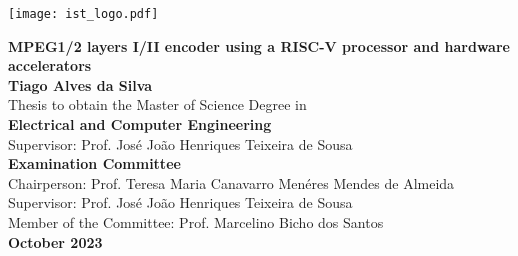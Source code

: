 \documentclass[10pt]{esda}
\title{}
\author{}
\date{}
\begin{document}
\texttt{[image: ist\_logo.pdf]}

\thispagestyle{empty}

\begin{onehalfspace}

\begin{center}
\begin{Large}
  \vspace{5cm}
  {\bf \Large {MPEG1/2 layers I/II encoder using a RISC-V processor and hardware accelerators}}\\
  \vspace{1.5cm}
  {\bf \large Tiago Alves da Silva}\\
  \vspace{2cm}
  \normalsize {Thesis to obtain the Master of Science Degree in}\\
  \vspace{0.5cm}
  {\bf \Large {Electrical and Computer Engineering}}\\
  \vspace{2cm}
  \normalsize {Supervisor: Prof. José João Henriques Teixeira de Sousa}\\
  \vspace{1.5cm}
  {\bf \large Examination Committee}\\
  \vspace{1cm}
  \normalsize {Chairperson: Prof. Teresa Maria Canavarro Menéres Mendes de Almeida}\\
  \normalsize {Supervisor: Prof. José João Henriques Teixeira de Sousa}\\
  \normalsize {Member of the Committee: Prof. Marcelino Bicho dos Santos}\\

  \vspace{2cm}
  {\bf \large October 2023 }
\end{Large}
\end{center}

\end{onehalfspace}
\end{document}
